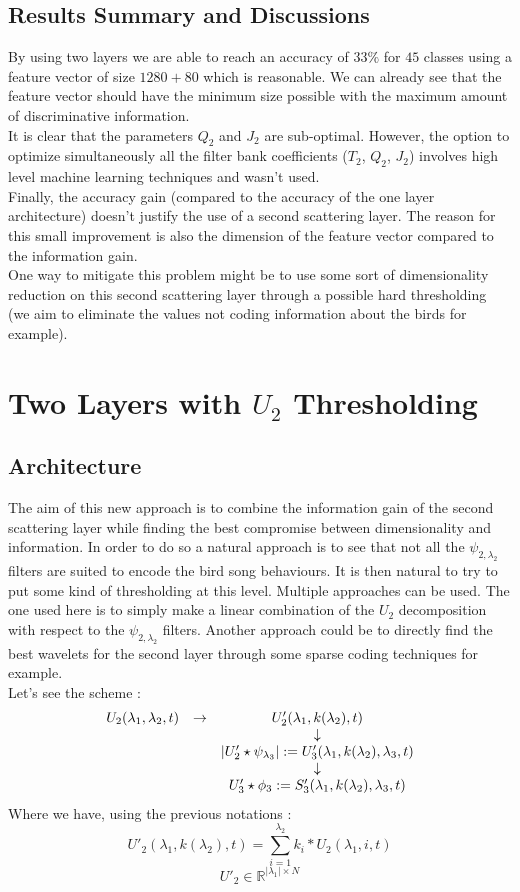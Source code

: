 \documentclass[a4paper]{report}
\begin{document}
\subsection{Results Summary and Discussions}
By using two layers we are able to reach an accuracy of $33\%$ for $45$ classes using a feature vector of size $1280+80$ which is reasonable. We can already see that the feature vector should have the minimum size possible with the maximum amount of discriminative information. 
\\
It is clear that the parameters $Q_2$ and $J_2$ are sub-optimal. However, the option to optimize simultaneously all the filter bank coefficients ($T_2$, $Q_2$, $J_2$) involves high level machine learning techniques and wasn't used.
\\
Finally, the accuracy gain (compared to the accuracy of the one layer architecture) doesn't justify the use of a second scattering layer. The reason for this small improvement is also the dimension of the feature vector compared to the information gain.\\
One way to mitigate this problem might be to use some sort of dimensionality reduction on this second scattering layer through a possible hard thresholding (we aim to eliminate the values not coding information about the birds for example).
\section{Two Layers with $U_2$ Thresholding}
\subsection{Architecture}
The aim of this new approach is to combine the information gain of the second scattering layer while finding the best compromise between dimensionality and information. In order to do so a natural approach is to see that not all the $\psi_{2,\lambda_2}$ filters are suited to encode the bird song behaviours. It is then natural to try to put some kind of thresholding at this level.  Multiple approaches can be used. The one used here is to simply make a linear combination of the $U_2$ decomposition with respect to the $\psi_{2,\lambda_2}$ filters. Another approach could be to directly find the best wavelets for the second layer through some sparse coding techniques for example.\\
 Let's see the scheme :
\begin{equation}
\begin{array}{c c c}
U_2(\lambda_1, \lambda_2,t)& \rightarrow &U'_2(\lambda_1,k(\lambda_2),t) \\
& & \downarrow \\
& & |U'_2 \star \psi_{\lambda_3}| := U'_3(\lambda_1, k(\lambda_2),\lambda_3,t) \\
& & \downarrow \\
& & U'_3 \star \phi_3 := S'_3(\lambda_1, k(\lambda_2),\lambda_3,t)\\
\end{array}
\end{equation}
Where we have, using the previous notations :
\[
U'_2(\lambda_1,k(\lambda_2),t)=
\sum_{i=1}^{\lambda_2}k_i*U_2(\lambda_1,i,t)
\]
\[
U'_2 \in \mathbb{R}^{| \lambda_1| \times N}
\]
\end{document}
